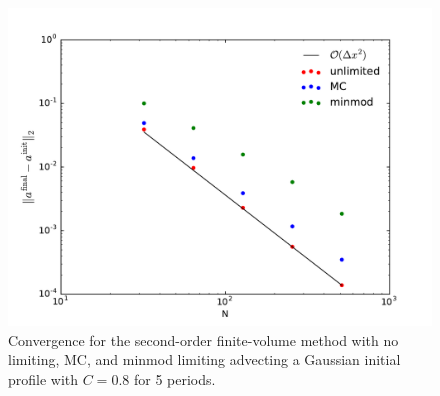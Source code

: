 \begin{figure}[t]
\centering
\includegraphics[width=0.8\linewidth]{plm-converge}
\caption[Convergence of second-order finite-volume advection]
        {\label{fig:advnorm} Convergence for the second-order
          finite-volume method with no limiting, MC, and minmod limiting advecting a
          Gaussian initial profile with $C = 0.8$ for 5 periods. \\
        }
\end{figure}

